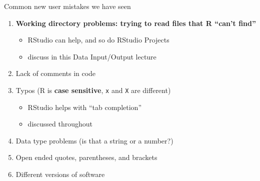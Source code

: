 \documentclass[
  ignorenonframetext,
]{beamer}
\providecommand{\tightlist}{%
  \setlength{\itemsep}{0pt}\setlength{\parskip}{0pt}}
\begin{document}
\begin{frame}[fragile]{Common new user mistakes we have seen}
\protect\hypertarget{common-new-user-mistakes-we-have-seen}{}

\begin{enumerate}
\tightlist
\item
  \textbf{Working directory problems: trying to read files that R
  ``can't find''}

  \begin{itemize}
  \tightlist
  \item
    RStudio can help, and so do RStudio Projects
  \item
    discuss in this Data Input/Output lecture
  \end{itemize}
\item
  Lack of comments in code
\item
  Typos (R is \textbf{case sensitive}, \texttt{x} and \texttt{X} are
  different)

  \begin{itemize}
  \tightlist
  \item
    RStudio helps with ``tab completion''
  \item
    discussed throughout
  \end{itemize}
\item
  Data type problems (is that a string or a number?)
\item
  Open ended quotes, parentheses, and brackets\\
\item
  Different versions of software
\end{enumerate}

\end{frame}
\end{document}
